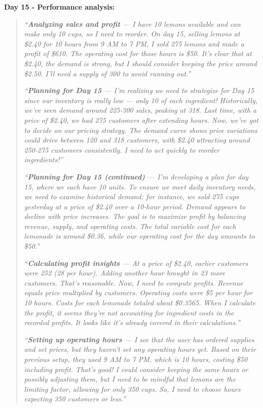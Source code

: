 \documentclass[11pt]{article}
\begin{document}
\textbf{Day 15 - Performance analysis:}
\begin{quote}
\textit{``\textbf{Analyzing sales and profit} --- I have 10 lemons available and can make only 10 cups, so I need to reorder. On day 15, selling lemons at \$2.40 for 10 hours from 9 AM to 7 PM, I sold 275 lemons and made a profit of \$610. The operating cost for those hours is \$50. It's clear that at \$2.40, the demand is strong, but I should consider keeping the price around \$2.50. I'll need a supply of 300 to avoid running out.''}

\textit{``\textbf{Planning for Day 15} --- I'm realizing we need to strategize for Day 15 since our inventory is really low --- only 10 of each ingredient! Historically, we've seen demand around 225-300 sales, peaking at 318. Last time, with a price of \$2.40, we had 275 customers after extending hours. Now, we've got to decide on our pricing strategy. The demand curve shows price variations could drive between 120 and 318 customers, with \$2.40 attracting around 250-275 customers consistently. I need to act quickly to reorder ingredients!''}

\textit{``\textbf{Planning for Day 15 (continued)} --- I'm developing a plan for day 15, where we each have 10 units. To ensure we meet daily inventory needs, we need to examine historical demand; for instance, we sold 275 cups yesterday at a price of \$2.40 over a 10-hour period. Demand appears to decline with price increases. The goal is to maximize profit by balancing revenue, supply, and operating costs. The total variable cost for each lemonade is around \$0.36, while our operating cost for the day amounts to \$50.''}

\textit{``\textbf{Calculating profit insights} --- At a price of \$2.40, earlier customers were 252 (28 per hour). Adding another hour brought in 23 more customers. That's reasonable. Now, I need to compute profits. Revenue equals price multiplied by customers. Operating costs were \$5 per hour for 10 hours. Costs for each lemonade totaled about \$0.3565. When I calculate the profit, it seems they're not accounting for ingredient costs in the recorded profits. It looks like it's already covered in their calculations.''}

\textit{``\textbf{Setting up operating hours} --- I see that the user has ordered supplies and set prices, but they haven't set any operating hours yet. Based on their previous setup, they used 9 AM to 7 PM, which is 10 hours, costing \$50 including profit. That's good! I could consider keeping the same hours or possibly adjusting them, but I need to be mindful that lemons are the limiting factor, allowing for only 350 cups. So, I need to choose hours expecting 350 customers or less.''}
\end{quote}
\end{document}
